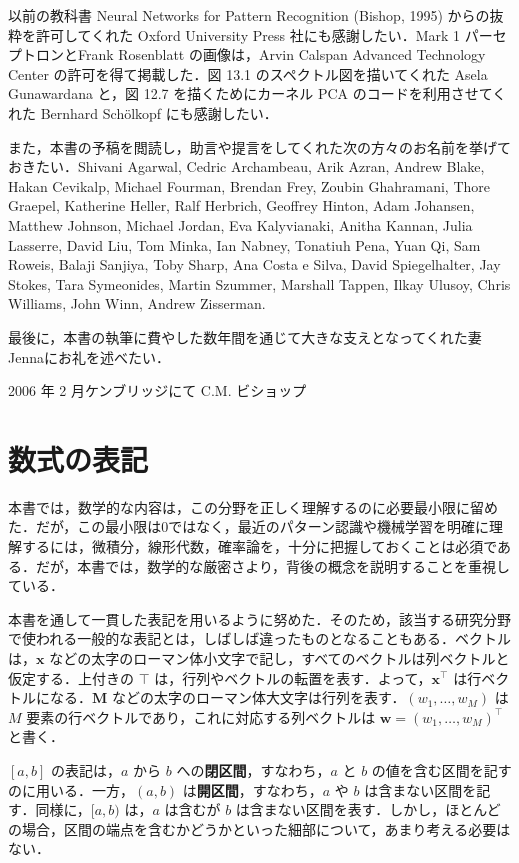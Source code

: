 \documentclass[uplatex,a4paper,oneside,openany,dvipdfmx]{jsarticle}
\numberwithin{equation}{section}
\theoremstyle{mystyle} %
\newcommand{\tb}[1]{\textbf{#1}}
\newcommand{\bs}[1]{\boldsymbol{#1}}
\begin{document}
以前の教科書 Neural Networks for Pattern Recognition (Bishop, 1995) からの抜粋を許可してくれた Oxford University Press 社にも感謝したい．Mark 1 パーセプトロンとFrank Rosenblatt の画像は，Arvin Calspan Advanced Technology Center の許可を得て掲載した．図 13.1 のスペクトル図を描いてくれた Asela Gunawardana と，図 12.7 を描くためにカーネル PCA のコードを利用させてくれた Bernhard Sch\"{o}lkopf にも感謝したい．

また，本書の予稿を閲読し，助言や提言をしてくれた次の方々のお名前を挙げておきたい．Shivani Agarwal, Cedric Archambeau, Arik Azran, Andrew Blake, Hakan Cevikalp, Michael Fourman, Brendan Frey, Zoubin Ghahramani, Thore Graepel, Katherine Heller, Ralf Herbrich, Geoffrey Hinton, Adam Johansen, Matthew Johnson, Michael Jordan,
Eva Kalyvianaki, Anitha Kannan, Julia Lasserre, David Liu, Tom Minka, Ian Nabney,
Tonatiuh Pena, Yuan Qi, Sam Roweis, Balaji Sanjiya, Toby Sharp, Ana Costa e Silva,
David Spiegelhalter, Jay Stokes, Tara Symeonides, Martin Szummer, Marshall Tappen,
Ilkay Ulusoy, Chris Williams, John Winn, Andrew Zisserman.

最後に，本書の執筆に費やした数年間を通じて大きな支えとなってくれた妻 Jennaにお礼を述べたい．

\vspace{13Q}

2006 年 2 月ケンブリッジにて C.M. ビショップ

\section*{数式の表記}

本書では，数学的な内容は，この分野を正しく理解するのに必要最小限に留めた．だが，この最小限は0ではなく，最近のパターン認識や機械学習を明確に理解するには，微積分，線形代数，確率論を，十分に把握しておくことは必須である．だが，本書では，数学的な厳密さより，背後の概念を説明することを重視している．

本書を通して一貫した表記を用いるように努めた．そのため，該当する研究分野で使われる一般的な表記とは，しばしば違ったものとなることもある．ベクトルは，$\bs{x}$ などの太字のローマン体小文字で記し，すべてのベクトルは列ベクトルと仮定する．上付きの $\top$ は，行列やベクトルの転置を表す．よって，$\bs{x}^{\top}$ は行ベクトルになる．$\bs{M}$ などの太字のローマン体大文字は行列を表す．$(w_{1},\ldots,w_{M})$ は $M$ 要素の行ベクトルであり，これに対応する列ベクトルは $\bs{w} = (w_{1},\ldots,w_{M})^{\top}$ と書く．

$[a,b]$ の表記は，$a$ から $b$ への\tb{閉区間}，すなわち，$a$ と $b$ の値を含む区間を記すのに用いる．一方，$(a,b)$ は\tb{開区間}，すなわち，$a$ や $b$ は含まない区間を記す．同様に，$[a,b)$ は，$a$ は含むが $b$ は含まない区間を表す．しかし，ほとんどの場合，区間の端点を含むかどうかといった細部について，あまり考える必要はない．
\end{document}

